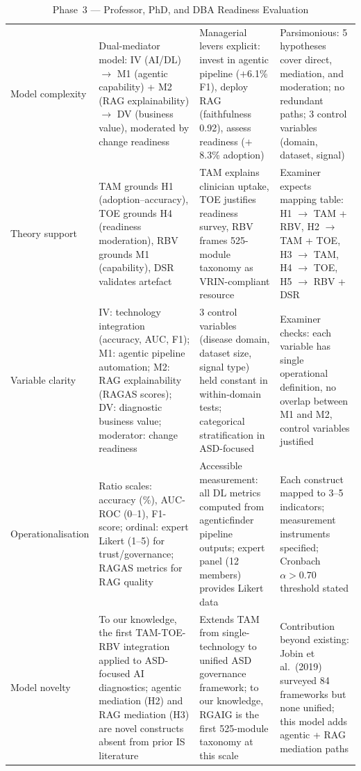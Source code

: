 \begingroup\singlespacing\tablefontsize\tablestripes
\begin{xltabular}{\textwidth}{@{} >{\raggedright\arraybackslash}p{0.17\textwidth} X X X @{}}
\caption{Phase~3 --- Professor, PhD, and DBA Readiness Evaluation}
\label{tab:phase3_readiness}\\
\toprule
{} &  &  &  \\
\midrule
\endfirsthead
\endhead
\bottomrule
\endlastfoot
Model complexity       & Dual-mediator model: IV (AI/DL) $\rightarrow$ M1 (agentic capability) + M2 (RAG explainability) $\rightarrow$ DV (business value), moderated by change readiness & Managerial levers explicit: invest in agentic pipeline ($+$6.1\% F1), deploy RAG (faithfulness 0.92), assess readiness ($+$8.3\% adoption) & Parsimonious: 5 hypotheses cover direct, mediation, and moderation; no redundant paths; 3 control variables (domain, dataset, signal) \\
\addlinespace
Theory support         & TAM grounds H1 (adoption--accuracy), TOE grounds H4 (readiness moderation), RBV grounds M1 (capability), DSR validates artefact & TAM explains clinician uptake, TOE justifies readiness survey, RBV frames 525-module taxonomy as VRIN-compliant resource & Examiner expects mapping table: H1 $\rightarrow$ TAM + RBV, H2 $\rightarrow$ TAM + TOE, H3 $\rightarrow$ TAM, H4 $\rightarrow$ TOE, H5 $\rightarrow$ RBV + DSR \\
\addlinespace
Variable clarity       & IV: technology integration (accuracy, AUC, F1); M1: agentic pipeline automation; M2: RAG explainability (RAGAS scores); DV: diagnostic business value; moderator: change readiness & 3 control variables (disease domain, dataset size, signal type) held constant in within-domain tests; categorical stratification in ASD-focused & Examiner checks: each variable has single operational definition, no overlap between M1 and M2, control variables justified \\
\addlinespace
Operationalisation     & Ratio scales: accuracy (\%), AUC-ROC (0--1), F1-score; ordinal: expert Likert (1--5) for trust/governance; RAGAS metrics for RAG quality & Accessible measurement: all DL metrics computed from agenticfinder pipeline outputs; expert panel (12 members) provides Likert data & Each construct mapped to 3--5 indicators; measurement instruments specified; Cronbach $\alpha > 0.70$ threshold stated \\
\addlinespace
Model novelty          & To our knowledge, the first TAM-TOE-RBV integration applied to ASD-focused AI diagnostics; agentic mediation (H2) and RAG mediation (H3) are novel constructs absent from prior IS literature & Extends \citet{davis1989tam} TAM from single-technology to unified ASD governance framework; to our knowledge, RGAIG is the first 525-module taxonomy at this scale & Contribution beyond existing: Jobin et al.\ (2019) surveyed 84 frameworks but none unified; this model adds agentic + RAG mediation paths \\

\end{xltabular}
